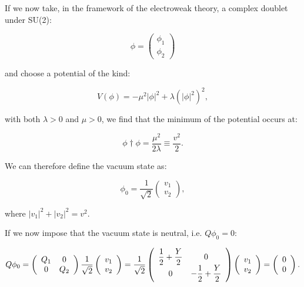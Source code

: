 If we now take, in the framework of the electroweak theory, a complex doublet under SU(2):

\begin{equation}
\phi = \left(\begin{array}{c}\phi_1 \\\phi_2\end{array}\right)
\end{equation}

and choose a potential of the kind:

\begin{equation}
V(\phi) = - \mu^2 |\phi|^2 + \lambda (|\phi|^2)^2,
\end{equation}

with both $\lambda > 0$ and $\mu > 0$, we find that the minimum of the potential occurs at: 

\begin{equation}
\phi\dag\phi = \dfrac{\mu^2}{2\lambda} \equiv \dfrac{v^2}{2}.
\end{equation}

We can therefore define the vacuum state as:

\begin{equation}
\phi_0 = \dfrac{1}{\sqrt{2}} \left(\begin{array}{c}v_1 \\v_2\end{array}\right),
\end{equation}

where $|v_1|^2 + |v_2|^2 = v^2$.

If we now impose that the vacuum state is neutral, i.e. $Q\phi_0 = 0$:

\begin{equation}
Q\phi_0 = \left(\begin{array}{cc}Q_1 & 0 \\0 & Q_2\end{array}\right)   \dfrac{1}{\sqrt{2}} \left(\begin{array}{c}v_1 \\v_2\end{array}\right) = \dfrac{1}{\sqrt{2}} \left(\begin{array}{cc}\dfrac{1}{2} + \dfrac{Y}{2} & 0 \\0 & -\dfrac{1}{2} + \dfrac{Y}{2}\end{array}\right) \left(\begin{array}{c}v_1 \\v_2\end{array}\right) = \left(\begin{array}{c}0 \\0\end{array}\right).
\end{equation}

